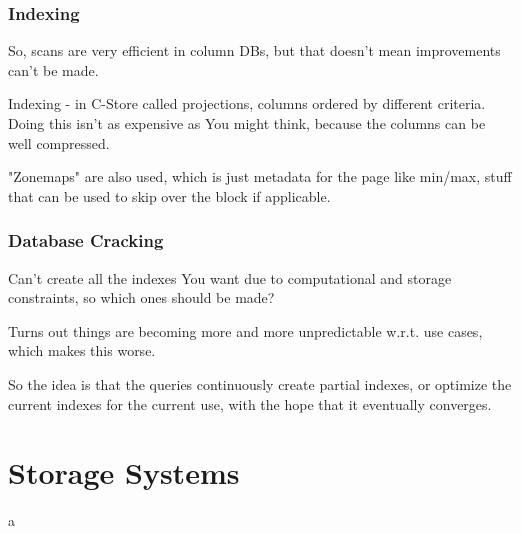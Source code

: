 \documentclass{article}
\begin{document}
		\subsubsection{Indexing}
			
			So, scans are very efficient in column DBs, but that doesn't mean improvements can't be made.
			
			Indexing - in C-Store called projections, columns ordered by different criteria. Doing this isn't as expensive as You might think, because the columns can be well compressed.
		
			"Zonemaps" are also used, which is just metadata for the page like min/max, stuff that can be used to skip over the block if applicable.
			
		\subsubsection{Database Cracking}
		
			Can't create all the indexes You want due to computational and storage constraints, so which ones should be made?
			
			Turns out things are becoming more and more unpredictable w.r.t. use cases, which makes this worse.
			
			So the idea is that the queries continuously create partial indexes, or optimize the current indexes for the current use, with the hope that it eventually converges.
			
			
			
			
		
	
		
		
		
		
		
		
		
		
		
		
\newpage
\section{Storage Systems}
	
	a

		
		
		
		
		
		
		
		
		
\end{document}
